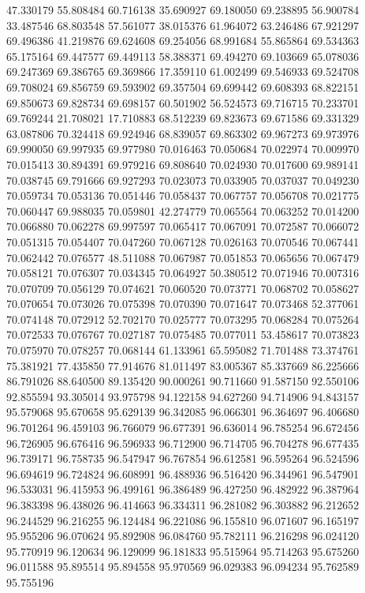 47.330179
55.808484
60.716138
35.690927
69.180050
69.238895
56.900784
33.487546
68.803548
57.561077
38.015376
61.964072
63.246486
67.921297
69.496386
41.219876
69.624608
69.254056
68.991684
55.865864
69.534363
65.175164
69.447577
69.449113
58.388371
69.494270
69.103669
65.078036
69.247369
69.386765
69.369866
17.359110
61.002499
69.546933
69.524708
69.708024
69.856759
69.593902
69.357504
69.699442
69.608393
68.822151
69.850673
69.828734
69.698157
60.501902
56.524573
69.716715
70.233701
69.769244
21.708021
17.710883
68.512239
69.823673
69.671586
69.331329
63.087806
70.324418
69.924946
68.839057
69.863302
69.967273
69.973976
69.990050
69.997935
69.977980
70.016463
70.050684
70.022974
70.009970
70.015413
30.894391
69.979216
69.808640
70.024930
70.017600
69.989141
70.038745
69.791666
69.927293
70.023073
70.033905
70.037037
70.049230
70.059734
70.053136
70.051446
70.058437
70.067757
70.056708
70.021775
70.060447
69.988035
70.059801
42.274779
70.065564
70.063252
70.014200
70.066880
70.062278
69.997597
70.065417
70.067091
70.072587
70.066072
70.051315
70.054407
70.047260
70.067128
70.026163
70.070546
70.067441
70.062442
70.076577
48.511088
70.067987
70.051853
70.065656
70.067479
70.058121
70.076307
70.034345
70.064927
50.380512
70.071946
70.007316
70.070709
70.056129
70.074621
70.060520
70.073771
70.068702
70.058627
70.070654
70.073026
70.075398
70.070390
70.071647
70.073468
52.377061
70.074148
70.072912
52.702170
70.025777
70.073295
70.068284
70.075264
70.072533
70.076767
70.027187
70.075485
70.077011
53.458617
70.073823
70.075970
70.078257
70.068144
61.133961
65.595082
71.701488
73.374761
75.381921
77.435850
77.914676
81.011497
83.005367
85.337669
86.225666
86.791026
88.640500
89.135420
90.000261
90.711660
91.587150
92.550106
92.855594
93.305014
93.975798
94.122158
94.627260
94.714906
94.843157
95.579068
95.670658
95.629139
96.342085
96.066301
96.364697
96.406680
96.701264
96.459103
96.766079
96.677391
96.636014
96.785254
96.672456
96.726905
96.676416
96.596933
96.712900
96.714705
96.704278
96.677435
96.739171
96.758735
96.547947
96.767854
96.612581
96.595264
96.524596
96.694619
96.724824
96.608991
96.488936
96.516420
96.344961
96.547901
96.533031
96.415953
96.499161
96.386489
96.427250
96.482922
96.387964
96.383398
96.438026
96.414663
96.334311
96.281082
96.303882
96.212652
96.244529
96.216255
96.124484
96.221086
96.155810
96.071607
96.165197
95.955206
96.070624
95.892908
96.084760
95.782111
96.216298
96.024120
95.770919
96.120634
96.129099
96.181833
95.515964
95.714263
95.675260
96.011588
95.895514
95.894558
95.970569
96.029383
96.094234
95.762589
95.755196
